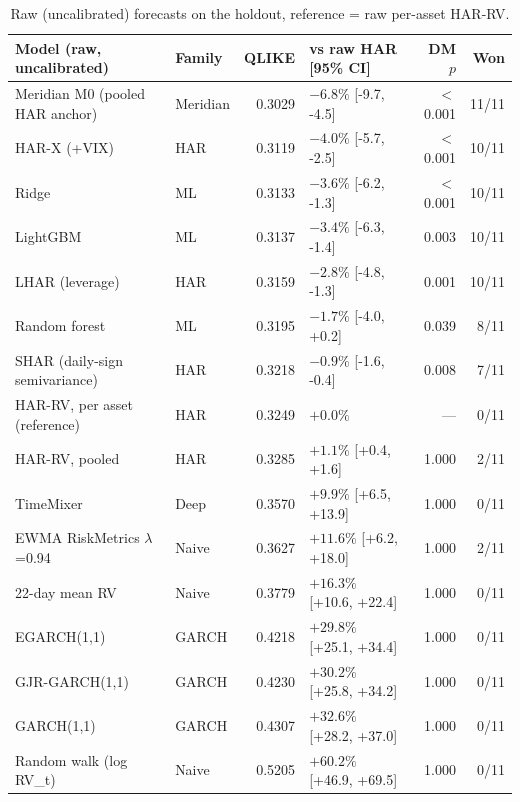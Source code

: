 \begin{table}[!htbp]
\centering
\scriptsize
\caption{Raw (uncalibrated) forecasts on the holdout, reference = raw per-asset HAR-RV.}
\label{tab:volraw}
\begin{tabularx}{\linewidth}{X l r l r r}
\toprule
\textbf{Model (raw, uncalibrated)} & \textbf{Family} & \textbf{QLIKE} & \textbf{vs raw HAR [95\% CI]} & \textbf{DM $p$} & \textbf{Won} \\
\midrule
\rowcolor{good}Meridian M0 (pooled HAR anchor) & Meridian & 0.3029 & $-6.8\%$ [-9.7, -4.5] & $<$0.001 & 11/11 \\
HAR-X (+VIX) & HAR & 0.3119 & $-4.0\%$ [-5.7, -2.5] & $<$0.001 & 10/11 \\
Ridge & ML & 0.3133 & $-3.6\%$ [-6.2, -1.3] & $<$0.001 & 10/11 \\
LightGBM & ML & 0.3137 & $-3.4\%$ [-6.3, -1.4] & 0.003 & 10/11 \\
LHAR (leverage) & HAR & 0.3159 & $-2.8\%$ [-4.8, -1.3] & 0.001 & 10/11 \\
Random forest & ML & 0.3195 & $-1.7\%$ [-4.0, +0.2] & 0.039 & 8/11 \\
SHAR (daily-sign semivariance) & HAR & 0.3218 & $-0.9\%$ [-1.6, -0.4] & 0.008 & 7/11 \\
HAR-RV, per asset (reference) & HAR & 0.3249 & $+0.0\%$  & --- & 0/11 \\
HAR-RV, pooled & HAR & 0.3285 & $+1.1\%$ [+0.4, +1.6] & 1.000 & 2/11 \\
TimeMixer & Deep & 0.3570 & $+9.9\%$ [+6.5, +13.9] & 1.000 & 0/11 \\
EWMA RiskMetrics $\lambda$=0.94 & Naive & 0.3627 & $+11.6\%$ [+6.2, +18.0] & 1.000 & 2/11 \\
22-day mean RV & Naive & 0.3779 & $+16.3\%$ [+10.6, +22.4] & 1.000 & 0/11 \\
EGARCH(1,1) & GARCH & 0.4218 & $+29.8\%$ [+25.1, +34.4] & 1.000 & 0/11 \\
GJR-GARCH(1,1) & GARCH & 0.4230 & $+30.2\%$ [+25.8, +34.2] & 1.000 & 0/11 \\
GARCH(1,1) & GARCH & 0.4307 & $+32.6\%$ [+28.2, +37.0] & 1.000 & 0/11 \\
Random walk (log RV\_t) & Naive & 0.5205 & $+60.2\%$ [+46.9, +69.5] & 1.000 & 0/11 \\
\bottomrule
\end{tabularx}
\end{table}
